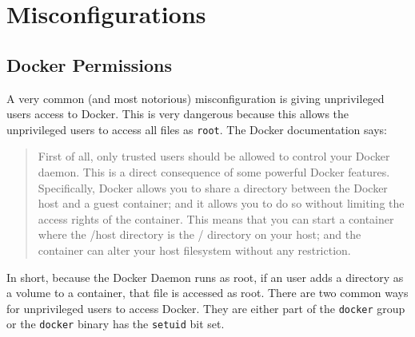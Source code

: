 \section{Misconfigurations}

\subsection{Docker Permissions}
A very common (and most notorious) misconfiguration is giving unprivileged users access to Docker. This is very dangerous because this allows the unprivileged users to access all files as \lstinline{root}. The Docker documentation says\cite{Docker-Daemon-Attack-Surface}:
\begin{quote}
First of all, only trusted users should be allowed to control your Docker daemon. This is a direct consequence of some powerful Docker features. Specifically, Docker allows you to share a directory between the Docker host and a guest container; and it allows you to do so without limiting the access rights of the container. This means that you can start a container where the /host directory is the / directory on your host; and the container can alter your host filesystem without any restriction.
\end{quote}

In short, because the Docker Daemon runs as root, if an user adds a directory as a volume to a container, that file is accessed as root. There are two common ways for unprivileged users to access Docker. They are either part of the \lstinline{docker} group or the \lstinline{docker} binary has the \lstinline{setuid} bit set.

